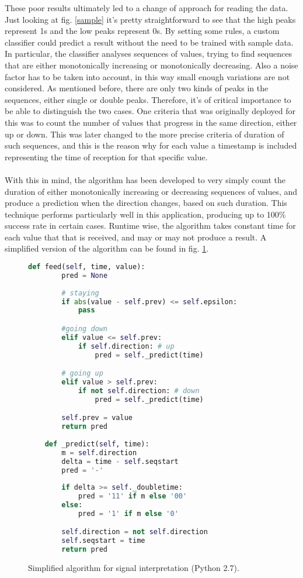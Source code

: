 These poor results ultimately led to a change of approach for reading the data. 
Just looking at fig. \ref{sample} it's pretty straightforward to see that the high peaks represent 1s and the low peaks represent 0s. 
By setting some rules, a custom classifier could predict a result without the need to be trained with sample data.
In particular, the classifier analyses sequences of values, trying to find sequences that are either monotonically increasing or monotonically decreasing.
Also a noise factor has to be taken into account, in this way small enough variations are not considered.
As mentioned before, there are only two kinds of peaks in the sequences, either single or double peaks.
Therefore, it's of critical importance to be able to distinguish the two cases. One criteria that was originally deployed for this was to count the number of values that progress in the same direction, either up or down. This was later changed to the more precise criteria of duration of such sequences, and this is the reason why for each value a timestamp is included representing the time of reception for that specific value.\\ \\
With this in mind, the algorithm has been developed to very simply count the duration of either monotonically increasing or decreasing sequences of values, and produce a prediction when the direction changes, based on such duration.
This technique performs particularly well in this application, producing up to 100\% success rate in certain cases.
 Runtime wise, the algorithm takes constant time for each value that that is received, and may or may not produce a result.
A simplified version of the algorithm can be found in fig. \ref{code}.
\begin{figure}
\centering
\begin{lstlisting}[language=Python, frame={}]
	def feed(self, time, value):
		pred = None
		
		# staying
		if abs(value - self.prev) <= self.epsilon:
			pass

		#going down
		elif value <= self.prev: 
			if self.direction: # up	
				pred = self._predict(time)

		# going up
		elif value > self.prev: 
			if not self.direction: # down
				pred = self._predict(time)

		self.prev = value
		return pred
		
	def _predict(self, time):
		m = self.direction
		delta = time - self.seqstart
		pred = '-'
		
		if delta >= self._doubletime:
			pred = '11' if m else '00'
		else:
			pred = '1' if m else '0'

		self.direction = not self.direction
		self.seqstart = time
		return pred
\end{lstlisting}
\caption{Simplified algorithm for signal interpretation (Python 2.7).}
\label{code}
\end{figure}

